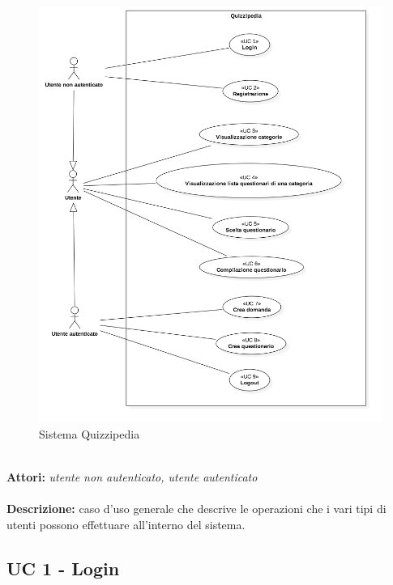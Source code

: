 \documentclass[a4paper,11pt]{article}
\begin{document}
\begin{figure}[h!]
\centering
\includegraphics[scale=0.6]{../immagini/Main.png}
\caption{Sistema Quizzipedia}
\end{figure}
\ \\
\textbf{Attori:} \textit{utente non autenticato, utente autenticato}
\\ \\
\textbf{Descrizione:} caso d'uso generale che descrive le operazioni che i vari tipi di utenti possono effettuare all'interno del sistema.\\


\subsection{UC 1 - Login}
\end{document}
